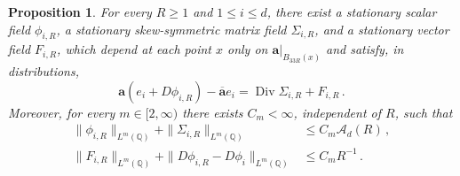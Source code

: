 \documentclass[11pt]{amsart}
\newtheorem{proposition}{Proposition}[section]
\theoremstyle{definition}
\theoremstyle{remark}
\numberwithin{equation}{section}
\newcommand{\Q}{\mathbb Q}
\renewcommand{\a}{\mathbf a}
\newcommand{\ahom}{\overline{\mathbf a}}
\newcommand{\Div}{\operatorname{Div}}
\newcommand{\cA}{\mathcal A}
\begin{document}
\begin{proposition}\label{corrector.local}
For every $R\geq1$ and $1\leq i\leq d$, there exist a stationary scalar field $\phi_{i,R}$, a stationary skew-symmetric matrix field $\Sigma_{i,R}$, and a stationary vector field $F_{i,R}$, which depend at each point $x$ only on $\a|_{B_{33R}(x)}$ and satisfy, in distributions,
\begin{equation}\label{eq.local-flux}
 \a(e_i+D\phi_{i,R})-\ahom e_i=\Div\Sigma_{i,R}+F_{i,R}\, .
\end{equation}
Moreover, for every $m\in[2,\infty)$ there exists $C_m<\infty$, independent of $R$, such that
\begin{align}
 \|\phi_{i,R}\|_{L^m(\Q)}+\|\Sigma_{i,R}\|_{L^m(\Q)}&\leq C_m\cA_d(R)\, ,\label{eq.local-corrector-bounds}\\
 \|F_{i,R}\|_{L^m(\Q)}+\|D\phi_{i,R}-D\phi_i\|_{L^m(\Q)}&\leq C_mR^{-1}\, .
 \label{eq.refined-local-errors}
\end{align}
\end{proposition}
\end{document}
